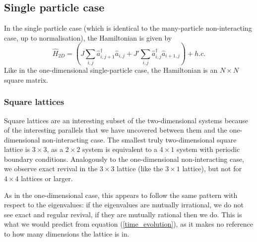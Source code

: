 \documentclass[a4paper, 10pt, draft]{article}
\theoremstyle{plain}
\begin{document}
\subsection{Single particle case}

In the single particle case (which is identical to the many-particle
non-interacting case, up to normalisation), the Hamiltonian is given by
\begin{equation}
    \hat{H}_{2D}
    =
    \left (
        J \sum_{i,j}{\hat{a}^{\dagger}_{i,j+1} \hat{a}_{i,j}} +
        J'\sum_{i,j}{\hat{a}^{\dagger}_{i,j}   \hat{a}_{i+1,j}}
    \right )
    +
    h.c.
\end{equation}
Like in the one-dimensional single-particle case, the Hamiltonian is an
$N \times N$ square matrix.

\subsubsection{Square lattices}

Square lattices are an interesting subset of the two-dimensional systems because
of the interesting parallels that we have uncovered between them and the
one-dimensional non-interacting case. The smallest truly two-dimensional square
lattice is $3 \times 3$, as a $2 \times 2$ system is equivalent to a $4 \times
1$ system with periodic boundary conditions. Analogously to the one-dimensional
non-interacting case, we observe exact revival in the $3 \times 3$ lattice (like
the $3 \times 1$ lattice), but not for $4 \times 4$ lattices or larger.

As in the one-dimensional case, this appears to follow the same pattern with
respect to the eigenvalues: if the eigenvalues are mutually irrational, we do
not see exact and regular revival, if they are mutually rational then we do.
This is what we would predict from equation (\ref{time_evolution}), as it makes
no reference to how many dimensions the lattice is in.
\end{document}
